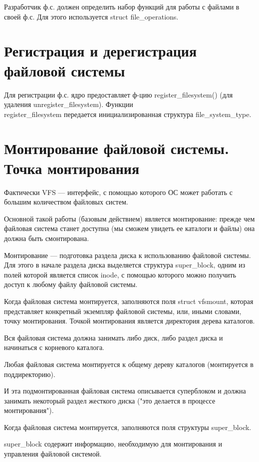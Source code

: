 Разработчик ф.с. должен определить набор функций для работы с файлами в своей ф.с. Для этого используется struct file\_operations.

\section{Регистрация и дерегистрация файловой системы}

Для регистрации ф.с. ядро предоставляет ф-цию register\_filesystem() (для удаления unregister\_filesystem). Функции \\ register\_filesystem передается инициализированная структура file\_system\_type.


\section{Монтирование файловой системы. Точка монтирования}

Фактически VFS — интерфейс, с помощью которого ОС может работать с большим количеством файловых систем.

Основной такой работы (базовым действием) является монтирование: прежде чем файловая система станет доступна (мы сможем увидеть ее каталоги и файлы) она должна быть смонтирована.

Монтирование — подготовка раздела диска к использованию файловой системы. Для этого в начале раздела диска выделяется структура super\_block, одним из полей которой является список inode, с помощью которого можно получить доступ к любому файлу файловой системы.

Когда файловая система монтируется, заполняются поля struct vfsmount, которая представляет конкретный экземпляр файловой системы, или, иными словами, точку монтирования. Точкой монтирования является директория дерева каталогов.

Вся файловая система должна занимать либо диск, либо раздел диска и начинаться с корневого каталога.

Любая файловая система монтируется к общему дереву каталогов (монтируется в поддиректорию).

И эта подмонтированная файловая система описывается суперблоком и должна занимать некоторый раздел жесткого диска ("это делается в процессе монтирования").

Когда файловая система монтируется, заполняются поля структуры super\_block.

super\_block содержит информацию, необходимую для монтирования и управления файловой системой.

